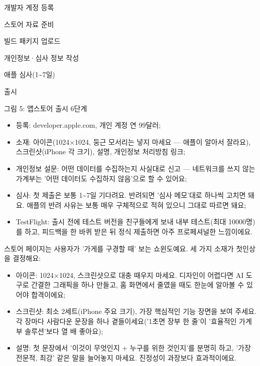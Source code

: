 
개발자 계정 등록

스토어 자료 준비

빌드 패키지 업로드

개인정보·심사 정보 작성

애플 심사(1\textasciitilde{}7일)

출시

\begin{center}\small\color{gray}그림 5: 앱스토어 출시 6단계\end{center}

\begin{itemize}
  \item 등록: developer.apple.com, 개인 계정 연 99달러;
  \item 소재: 아이콘(1024×1024, 둥근 모서리는 넣지 마세요 — 애플이 알아서 잘라요), 스크린샷(iPhone 각 크기), 설명, 개인정보 처리방침 링크;
  \item 개인정보 설문: 어떤 데이터를 수집하는지 사실대로 신고 — 네트워크를 쓰지 않는 가계부는 '어떤 데이터도 수집하지 않음'으로 할 수 있어요;
  \item 심사: 첫 제출은 보통 1\textasciitilde{}7일 기다려요. 반려되면 '심사 메모'대로 하나씩 고치면 돼요. 애플의 반려 사유는 보통 매우 구체적으로 적혀 있으니 그대로 따르면 돼요;
  \item TestFlight: 출시 전에 테스트 버전을 친구들에게 보내 내부 테스트(최대 10000명)를 하고, 피드백을 한 바퀴 받은 뒤 정식 제출하면 아주 프로페셔널한 느낌이에요.
\end{itemize}


스토어 페이지는 사용자가 '가게를 구경할 때' 보는 쇼윈도예요. 세 가지 소재가 첫인상을 결정해요:

\begin{itemize}
  \item 아이콘: 1024×1024, 스크린샷으로 대충 때우지 마세요. 디자인이 어렵다면 AI 도구로 간결한 그래픽을 하나 만들고, 홈 화면에서 줄였을 때도 한눈에 알아볼 수 있어야 합격이에요;
  \item 스크린샷: 최소 2세트(iPhone 주요 크기), 가장 핵심적인 기능 장면을 보여 주세요. 각 장마다 사람다운 문장을 하나 곁들이세요('1초면 장부 한 줄'이 '효율적인 가계부 솔루션'보다 열 배 좋아요);
  \item 설명: 첫 문장에서 '이것이 무엇인지 + 누구를 위한 것인지'를 분명히 하고, '가장 전문적, 최강' 같은 말을 늘어놓지 마세요. 진정성이 과장보다 효과적이에요.
\end{itemize}

